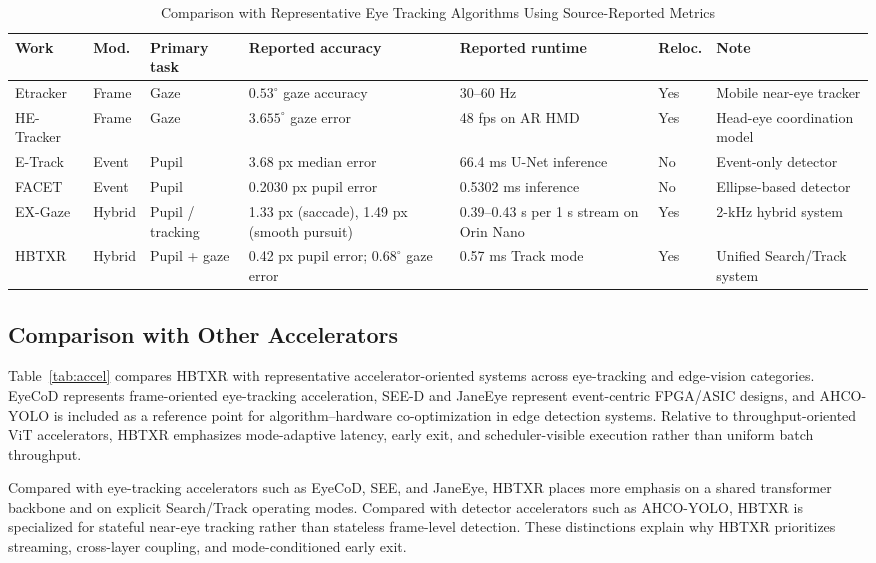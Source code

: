 \documentclass[journal]{IEEEtran}
\begin{document}
\begin{table}[t]
\caption{Comparison with Representative Eye Tracking Algorithms Using Source-Reported Metrics}
\label{tab:prior}
\centering
\scriptsize
\begin{tabularx}{\textwidth}{@{}L{0.11\textwidth}C{0.07\textwidth}L{0.12\textwidth}Y Y C{0.06\textwidth}L{0.12\textwidth}@{}}
\toprule
Work & Mod. & Primary task & Reported accuracy & Reported runtime & Reloc. & Note \\
\midrule
Etracker & Frame & Gaze & $0.53^{\circ}$ gaze accuracy & 30--60 Hz & Yes & Mobile near-eye tracker \\
HE-Tracker & Frame & Gaze & $3.655^{\circ}$ gaze error & 48 fps on AR HMD & Yes & Head-eye coordination model \\
E-Track & Event & Pupil & 3.68 px median error & 66.4 ms U-Net inference & No & Event-only detector \\
FACET & Event & Pupil & 0.2030 px pupil error & 0.5302 ms inference & No & Ellipse-based detector \\
EX-Gaze & Hybrid & Pupil / tracking & 1.33 px (saccade), 1.49 px (smooth pursuit) & 0.39--0.43 s per 1 s stream on Orin Nano & Yes & 2-kHz hybrid system \\
HBTXR & Hybrid & Pupil + gaze & 0.42 px pupil error; $0.68^{\circ}$ gaze error & 0.57 ms Track mode & Yes & Unified Search/Track system \\
\bottomrule
\end{tabularx}
\end{table}

\subsection{Comparison with Other Accelerators}
Table~\ref{tab:accel} compares HBTXR with representative accelerator-oriented systems across eye-tracking and edge-vision categories. EyeCoD represents frame-oriented eye-tracking acceleration, SEE-D and JaneEye represent event-centric FPGA/ASIC designs, and AHCO-YOLO is included as a reference point for algorithm--hardware co-optimization in edge detection systems. Relative to throughput-oriented ViT accelerators, HBTXR emphasizes mode-adaptive latency, early exit, and scheduler-visible execution rather than uniform batch throughput.

Compared with eye-tracking accelerators such as EyeCoD, SEE, and JaneEye, HBTXR places more emphasis on a shared transformer backbone and on explicit Search/Track operating modes. Compared with detector accelerators such as AHCO-YOLO, HBTXR is specialized for stateful near-eye tracking rather than stateless frame-level detection. These distinctions explain why HBTXR prioritizes streaming, cross-layer coupling, and mode-conditioned early exit.
\end{document}
